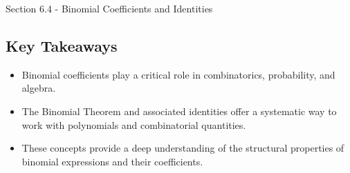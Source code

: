 \begin{notes}{Section 6.4 - Binomial Coefficients and Identities}
    \subsection*{Key Takeaways}
    \begin{itemize}
        \item Binomial coefficients play a critical role in combinatorics, probability, and algebra.
        \item The Binomial Theorem and associated identities offer a systematic way to work with polynomials and combinatorial quantities.
        \item These concepts provide a deep understanding of the structural properties of binomial expressions and their coefficients.
    \end{itemize}    
\end{notes}